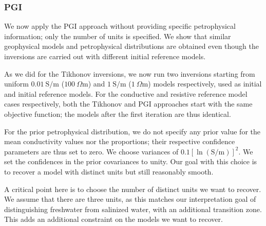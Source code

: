 \documentclass[extra]{gji} %
\begin{document}
\subsubsection{PGI}

We now apply the PGI approach without providing specific petrophysical information; only the number of units is specified. We show that similar geophysical models and petrophysical distributions are obtained even though the inversions are carried out with different initial reference models.

As we did for the Tikhonov inversions, we now run two inversions starting from uniform $0.01~\text{S/m}$ ($100~\Omega \text{m}$) and $1~\text{S/m}$ ($1~\Omega \text{m}$) models respectively, used as initial and initial reference models. For the conductive and resistive reference model cases respectively, both the Tikhonov and PGI approaches start with the same objective function; the models after the first iteration are thus identical.

For the prior petrophysical distribution, we do not specify any prior value for the mean conductivity values nor the proportions; their respective confidence parameters are thus set to zero. We choose variances of $0.1 [\ln(\text{S/m})]^2$. We set the confidences in the prior covariances to unity. Our goal with this choice is to recover a model with distinct units but still reasonably smooth. %

A critical point here is to choose the number of distinct units we want to recover. We assume that there are three units, as this matches our interpretation goal of distinguishing freshwater from salinized water, with an additional transition zone. This adds an additional constraint on the models we want to recover.
\end{document}
